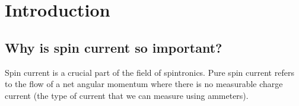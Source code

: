 \chapter{Introduction}

\label{chapter1}

\section{Why is spin current so important?}

Spin current is a crucial part of the field of spintronics. Pure spin current refers to the flow of a net angular momentum where there is no measurable charge current (the type of current that we can measure using ammeters).

